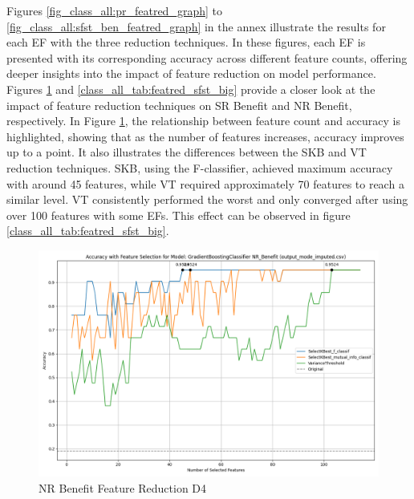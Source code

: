 \documentclass[12pt,letterpaper]{article}
\begin{document}
Figures \ref{fig_class_all:pr_featred_graph} to \ref{fig_class_all:sfst_ben_featred_graph} in the annex illustrate the results for each \ac{EF} with the three reduction techniques.
In these figures, each \ac{EF} is presented with its corresponding accuracy across different feature counts, offering deeper insights into the impact of feature reduction on model performance.
Figures \ref{class_all_tab:featred_nr_big} and \ref{class_all_tab:featred_sfst_big} provide a closer look at the impact of feature reduction techniques on \ac{SR} Benefit and \ac{NR} Benefit, respectively.
In Figure \ref{class_all_tab:featred_nr_big}, the relationship between feature count and accuracy is highlighted, showing that as the number of features increases, accuracy improves up to a point.
It also illustrates the differences between the \ac{SKB} and \ac{VT} reduction techniques.
\ac{SKB}, using the F-classifier, achieved maximum accuracy with around 45 features, while \ac{VT} required approximately 70 features to reach a similar level.
\ac{VT} consistently performed the worst and only converged after using over 100 features with some \ac{EF}s.
This effect can be observed in figure \ref{class_all_tab:featred_sfst_big}.

\begin{figure}[h]
    \centering
    \includegraphics[width=0.85\linewidth]{class_all_section/feature_selection_accuracy_plot_output_mode_imputedcsv_GradientBoostingClassifier_NR_Benefit.png}
    \caption{NR Benefit Feature Reduction D4}
    \label{class_all_tab:featred_nr_big}
\end{figure}
\end{document}
